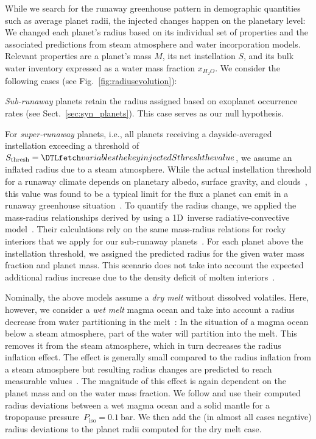 \documentclass[twocolumn,twocolappendix]{aastex631}
\begin{document}
While we search for the runaway greenhouse pattern in demographic quantities such as average planet radii, the injected changes happen on the planetary level: We changed each planet's radius based on its individual set of properties and the associated predictions from steam atmosphere and water incorporation models.
Relevant properties are a planet's mass $M$, its net instellation $S$, and its bulk water inventory expressed as a water mass fraction $x_{H_2O}$.
We consider the following cases (see Fig.~\ref{fig:radiusevolution}):

\textit{Sub-runaway} planets retain the radius assigned based on exoplanet occurrence rates (see Sect.~\ref{sec:syn_planets}).
This case serves as our null hypothesis.

For \textit{super-runaway} planets, i.e., all planets receiving a dayside-averaged instellation exceeding a threshold of $S_\mathrm{thresh} = \var{injectedSthresh}$, we assume an inflated radius due to a steam atmosphere.
While the actual instellation threshold for a runaway climate depends on planetary albedo, surface gravity, and clouds~\citep{2019Icar..317..583P,Turbet2021,Pierrehumbert2022}, this value was found to be a typical limit for the flux a planet can emit in a runaway greenhouse situation~\citep{Goldblatt2013,Kopparapu2013,Leconte2013,Hamano2015,2017JGRE..122.1458S,2019ApJ...875...31K,Boukrouche2021,2021JGRE..12606711L}.
To quantify the radius change, we applied the mass-radius relationships derived by \citet{Turbet2020} using a 1D~inverse radiative-convective model~\citep{Turbet2019}.
Their calculations rely on the same mass-radius relations for rocky interiors that we apply for our sub-runaway planets~\citep{Zeng2016}.
For each planet above the instellation threshold, we assigned the predicted radius for the given water mass fraction and planet mass.
This scenario does not take into account the expected additional radius increase due to the density deficit of molten interiors~\citep{Bower2019}. 

Nominally, the above models assume a \textit{dry melt} without dissolved volatiles.
Here, however, we consider a \textit{wet melt} magma ocean and take into account a radius decrease from water partitioning in the melt~\citep{Dorn2021}: In the situation of a magma ocean below a steam atmosphere, part of the water will partition into the melt.
This removes it from the steam atmosphere, which in turn decreases the radius inflation effect.
The effect is generally small compared to the radius inflation from a steam atmosphere but resulting radius changes are predicted to reach measurable values~\citep{Dorn2021}.
The magnitude of this effect is again dependent on the planet mass and on the water mass fraction.
We follow \citet{Dorn2021} and use their computed radius deviations between a wet magma ocean and a solid mantle for a tropopause pressure~$P_\mathrm{iso}=\SI{0.1}{\bar}$.
We then add the (in almost all cases negative) radius deviations to the planet radii computed for the dry melt case.
\end{document}
